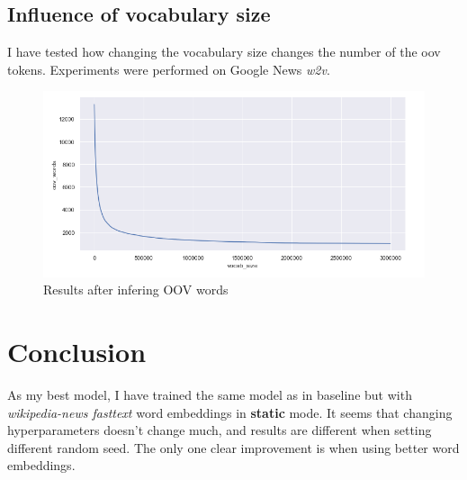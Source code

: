 \documentclass{article}
\begin{document}
\subsection{Influence of vocabulary size}
I have tested how changing the vocabulary size changes the number of the oov tokens.
Experiments were performed on Google News \textit{w2v}.
\begin{figure}[h]
    \centering
    \includegraphics[scale=0.5]{../figures/vocab_size.png}
    \caption{Results after infering OOV words}
\end{figure}

\newpage

\section*{Conclusion}
As my best model, I have trained the same model as in baseline but with
\textit{wikipedia-news fasttext} word embeddings in \textbf{static} mode.
It seems that changing hyperparameters doesn't change much, and results are
different when setting different random seed. The only one clear improvement is when using better
word embeddings.
\end{document}
